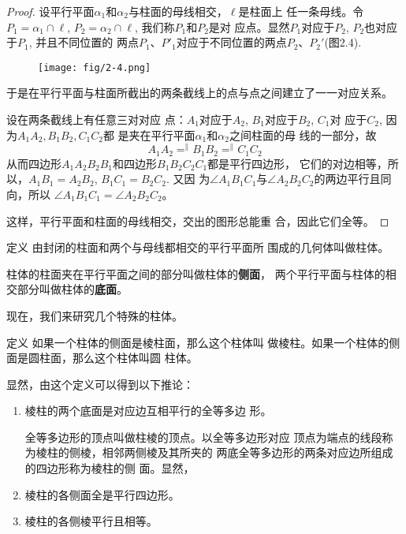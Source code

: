 \begin{proof}
    设平行平面$\alpha_1$和$\alpha_2$与柱面的母线相交，$\ell$是柱面上
任一条母线。令$P_1=\alpha_1\cap \ell$, $P_2=\alpha_2\cap\ell$, 我们称$P_1$和$P_2$是对
应点。显然$P_1$对应于$P_2$, $P_2$也对应于$P_1$, 并且不同位置的
两点$P_1$、$P'_1$对应于不同位置的两点$P_2$、$P_2'$(图2.4).

\begin{figure}[htp]
    \centering
\texttt{[image: fig/2-4.png]}
    \caption{}
\end{figure}


于是在平行平面与柱面所截出的两条截线上的点与点之间建立了一一对应关系。

设在两条截线上有任意三对对应
点：$A_1$对应于$A_2$, $B_1$对应于$B_2$, $C_1$对
应于$C_2$, 因为$A_1A_2,B_1B_2,C_1C_2$都
是夹在平行平面$\alpha_1$和$\alpha_2$之间柱面的母
线的一部分，故
\[A_1A_2\mathop{=}^{\parallel} B_1B_2\mathop{=}^{\parallel}C_1C_2\]
从而四边形$A_1A_2B_2B_1$和四边形$B_1B_2C_2C_1$都是平行四边形，
它们的对边相等，所以，$A_1B_1=A_2B_2$, $B_1C_1=B_2C_2$. 又因
为$\angle A_1B_1C_1$与$\angle A_2B_2C_2$的两边平行且同向，所以
$\angle A_1B_1C_1=\angle A_2B_2C_2$。

这样，平行平面和柱面的母线相交，交出的图形总能重
合，因此它们全等。
\end{proof}


\begin{blk}{定义} 
    由封闭的柱面和两个与母线都相交的平行平面所
围成的几何体叫做柱体。

柱体的柱面夹在平行平面之间的部分叫做柱体的\textbf{侧面}，
两个平行平面与柱体的相交部分叫做柱体的\textbf{底面}。
    
\end{blk}

现在，我们来研究几个特殊的柱体。

\begin{blk}{定义} 
    如果一个柱体的侧面是棱柱面，那么这个柱体叫
做棱柱。如果一个柱体的侧面是圆柱面，那么这个柱体叫圆
柱体。    
\end{blk}

显然，由这个定义可以得到以下推论：
\begin{enumerate}
\item 棱柱的两个底面是对应边互相平行的全等多边
形。

全等多边形的顶点叫做柱棱的顶点。以全等多边形对应
顶点为端点的线段称为棱柱的侧棱，相邻两侧棱及其所夹的
两底全等多边形的两条对应边所组成的四边形称为棱柱的侧
面。显然，
\item 棱柱的各侧面全是平行四边形。
\item 棱柱的各侧棱平行且相等。
\end{enumerate}


